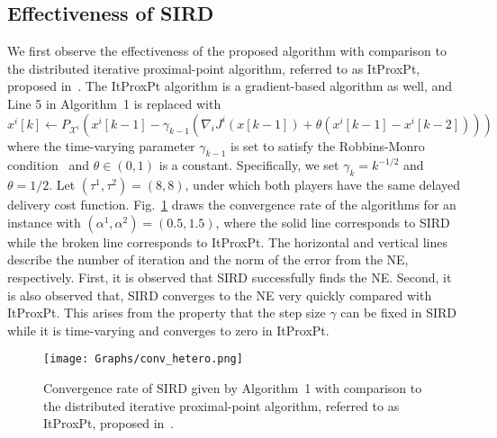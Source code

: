 \documentclass[letterpaper, 10 pt, conference]{ieeeconf}  %
\newcommand{\mc}[1]{\mathcal{#1}}
\begin{document}
\subsection{Effectiveness of SIRD}
We first observe the effectiveness of the proposed algorithm with comparison to the distributed iterative proximal-point algorithm, referred to as ItProxPt, proposed in~\cite{Chen2014Autonomous}.
The ItProxPt algorithm is a gradient-based algorithm as well, and Line 5 in Algorithm~1 is replaced with
$x^i[k] \leftarrow P_{\mc{X}^i}(x^i[k-1]-\gamma_{k-1}(\nabla _i J^i(x[k-1]) +\theta(x^i[k-1]-x^i[k-2])))$
where the time-varying parameter $\gamma_{k-1}$ is set to satisfy the Robbins-Monro condition~\cite[Chapter 2]{Borkar2009Stochastic}
and $\theta\in(0,1)$ is a constant.
Specifically, we set $\gamma_k=k^{-1/2}$ and $\theta=1/2$.
Let $(\tau^1,\tau^2)=(8,8)$, under which both players have the same delayed delivery cost function.
Fig.~\ref{fig:conv} draws the convergence rate of the algorithms for an instance with $(\alpha^1,\alpha^2)=(0.5,1.5)$, where the solid line corresponds to SIRD while the broken line corresponds to ItProxPt.
The horizontal and vertical lines describe the number of iteration and the norm of the error from the NE, respectively.
First, it is observed that SIRD successfully finds the NE.
Second, it is also observed that, SIRD converges to the NE very quickly compared with ItProxPt.
This arises from the property that the step size $\gamma$ can be fixed in SIRD while it is time-varying and converges to zero in ItProxPt.


\begin{figure}[t]
  \centering
  \texttt{[image: Graphs/conv\_hetero.png]}
  \caption{
  Convergence rate of SIRD given by Algorithm~1 with comparison to the distributed iterative proximal-point algorithm, referred to as ItProxPt, proposed in~\cite{Chen2014Autonomous}.
  }
  \label{fig:conv}
\end{figure}
\end{document}
